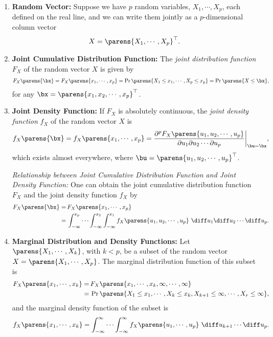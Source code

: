 \documentclass[12pt]{article}
\begin{document}
\begin{enumerate}[label=\textbf{\arabic*.}]

	\item \textbf{Random Vector:} Suppose we have $p$ random variables, $X_1, \cdots, X_p$, each defined on the real line, and we can write them jointly as a $p$-dimensional column vector 
	\begin{align*}
		X = \parens{X_1, \cdots, X_p}^\top. 
	\end{align*}
	
	\item \textbf{Joint Cumulative Distribution Function:} The \textit{joint distribution function} $F_X$ of the random vector $X$ is given by 
	\begin{align*}
		F_X \parens{\bx} = F_X \parens{x_1, \cdots, x_p} = \Pr \parens{X_1 \le x_1, \cdots, X_p \le x_p} = \Pr \parens{X \le \bx}, 
	\end{align*}
	for any $\bx = \parens{x_1, x_2, \cdots, x_p}^\top$. 
	
	\item \textbf{Joint Density Function:} If $F_X$ is absolutely continuous, the \emph{joint density function} $f_X$ of the random vector $X$ is 
	\begin{align*}
		f_X \parens{\bx} = f_X \parens{x_1, \cdots, x_p} = \frac{\partial^p F_X \parens{u_1, u_2, \cdots, u_p}}{\partial u_1 \partial u_2 \cdots \partial u_p}\bigg\vert_{\bu = \bx}, 
	\end{align*}
	which exists almost everywhere, where $\bu = \parens{u_1, u_2, \cdots, u_p}^\top$. 
	
	\textit{Relationship between Joint Cumulative Distribution Function and Joint Density Function:} One can obtain the joint cumulative distribution function $F_X$ and the joint density function $f_X$ by
	\begin{align*}
		F_X \parens{\bx} = & \, F_X \parens{x_1, \cdots, x_p} \\ 
		= & \, \int_{-\infty}^{x_p} \cdots \int_{-\infty}^{x_2} \int_{-\infty}^{x_1} f_{X} \parens{u_1, u_2, \cdots, u_p} \ \diff u_1 \diff u_2 \cdots \diff u_p. 
	\end{align*}
	
	\item \textbf{Marginal Distribution and Density Functions:} Let $\parens{X_1, \cdots, X_k}$, with $k < p$, be a subset of the random vector $X = \parens{X_1, \cdots, X_p}$. The marginal distribution function of this subset is 
	\begin{align*}
		F_X \parens{x_1, \cdots, x_k} = & \, F_X \parens{x_1, \cdots, x_k, \infty, \cdots, \infty} \nonumber \\ 
		= & \, \Pr \parens{X_1 \le x_1, \cdots, X_k \le x_k, X_{k+1} \le \infty, \cdots, X_r \le \infty}, 
	\end{align*}
	and the marginal density function of the subset is 
	\begin{align*}
		f_{X} \parens{x_1, \cdots, x_k} = \int_{-\infty}^\infty \cdots \int_{-\infty}^\infty f_{X} \parens{u_1, \cdots, u_p} \ \diff u_{k+1} \cdots \diff u_p.  
	\end{align*}
	

\end{enumerate}
\end{document}
